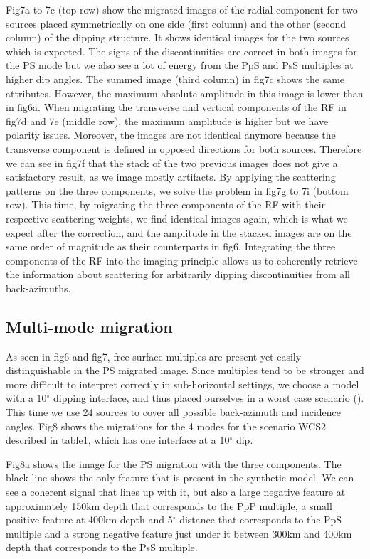 \documentclass[10pt,a4paper]{article}
\numberwithin{equation}{section}
\begin{document}
Fig7a to 7c (top row) show the migrated images of the radial component for two sources placed symmetrically on one side (first column) and the other (second column) of the dipping structure.
It shows identical images for the two sources which is expected.
The signs of the discontinuities are correct in both images for the PS mode but we also see a lot of energy from the PpS and PsS multiples at higher dip angles.
The summed image (third column) in fig7c shows the same attributes.
However, the maximum absolute amplitude in this image is lower than in fig6a.
When migrating the transverse and vertical components of the RF in fig7d and 7e (middle row), the maximum amplitude is higher but we have polarity issues.
Moreover, the images are not identical anymore because the transverse component is defined in opposed directions for both sources.
Therefore we can see in fig7f that the stack of the two previous images does not give a satisfactory result, as we image mostly artifacts.
By applying the scattering patterns on the three components, we solve the problem in fig7g to 7i (bottom row).
This time, by migrating the three components of the RF with their respective scattering weights, we find identical images again, which is what we expect after the correction, and the amplitude in the stacked images are on the same order of magnitude as their counterparts in fig6.
Integrating the three components of the RF into the imaging principle allows us to coherently retrieve the information about scattering for arbitrarily dipping discontinuities from all back-azimuths.

\subsection{Multi-mode migration}

As seen in fig6 and fig7, free surface multiples are present yet easily distinguishable in the PS migrated image.
Since multiples tend to be stronger and more difficult to interpret correctly in sub-horizontal settings, we choose a model with a 10$^{\circ}$ dipping interface, and thus placed ourselves in a worst case scenario (\cite{cheng_grl_17}).
This time we use 24 sources to cover all possible back-azimuth and incidence angles.
Fig8 shows the migrations for the 4 modes for the scenario WCS2 described in table1, which has one interface at a 10$^{\circ}$ dip.

Fig8a shows the image for the PS migration with the three components.
The black line shows the only feature that is present in the synthetic model.
We can see a coherent signal that lines up with it, but also a large negative feature at approximately 150km depth that corresponds to the PpP multiple, a small positive feature at 400km depth and 5$^{\circ}$ distance that corresponds to the PpS multiple and a strong negative feature just under it between 300km and 400km depth that corresponds to the PsS multiple.
\end{document}

